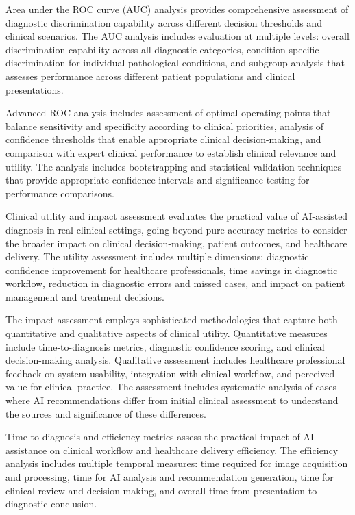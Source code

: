 Area under the ROC curve (AUC) analysis provides comprehensive assessment of diagnostic discrimination capability across different decision thresholds and clinical scenarios. The AUC analysis includes evaluation at multiple levels: overall discrimination capability across all diagnostic categories, condition-specific discrimination for individual pathological conditions, and subgroup analysis that assesses performance across different patient populations and clinical presentations.

Advanced ROC analysis includes assessment of optimal operating points that balance sensitivity and specificity according to clinical priorities, analysis of confidence thresholds that enable appropriate clinical decision-making, and comparison with expert clinical performance to establish clinical relevance and utility. The analysis includes bootstrapping and statistical validation techniques that provide appropriate confidence intervals and significance testing for performance comparisons.

Clinical utility and impact assessment evaluates the practical value of AI-assisted diagnosis in real clinical settings, going beyond pure accuracy metrics to consider the broader impact on clinical decision-making, patient outcomes, and healthcare delivery. The utility assessment includes multiple dimensions: diagnostic confidence improvement for healthcare professionals, time savings in diagnostic workflow, reduction in diagnostic errors and missed cases, and impact on patient management and treatment decisions.

The impact assessment employs sophisticated methodologies that capture both quantitative and qualitative aspects of clinical utility. Quantitative measures include time-to-diagnosis metrics, diagnostic confidence scoring, and clinical decision-making analysis. Qualitative assessment includes healthcare professional feedback on system usability, integration with clinical workflow, and perceived value for clinical practice. The assessment includes systematic analysis of cases where AI recommendations differ from initial clinical assessment to understand the sources and significance of these differences.

Time-to-diagnosis and efficiency metrics assess the practical impact of AI assistance on clinical workflow and healthcare delivery efficiency. The efficiency analysis includes multiple temporal measures: time required for image acquisition and processing, time for AI analysis and recommendation generation, time for clinical review and decision-making, and overall time from presentation to diagnostic conclusion.

